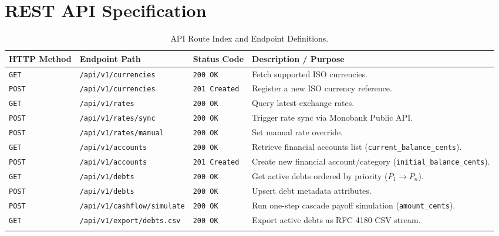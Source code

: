 \documentclass[11pt,a4paper]{article}
\begin{document}
\section{REST API Specification}

\noindent\begin{longtable}{@{\extracolsep{\fill}} l l l p{5.5cm} @{}}
\toprule
\textbf{HTTP Method} & \textbf{Endpoint Path} & \textbf{Status Code} & \textbf{Description / Purpose} \\ \midrule
\endhead
\bottomrule
\endfoot
\texttt{GET} & \texttt{/api/v1/currencies} & \texttt{200 OK} & Fetch supported ISO currencies. \\
\texttt{POST} & \texttt{/api/v1/currencies} & \texttt{201 Created} & Register a new ISO currency reference. \\
\texttt{GET} & \texttt{/api/v1/rates} & \texttt{200 OK} & Query latest exchange rates. \\
\texttt{POST} & \texttt{/api/v1/rates/sync} & \texttt{200 OK} & Trigger rate sync via Monobank Public API. \\
\texttt{POST} & \texttt{/api/v1/rates/manual} & \texttt{200 OK} & Set manual rate override. \\
\texttt{GET} & \texttt{/api/v1/accounts} & \texttt{200 OK} & Retrieve financial accounts list (\texttt{current\_balance\_cents}). \\
\texttt{POST} & \texttt{/api/v1/accounts} & \texttt{201 Created} & Create new financial account/category (\texttt{initial\_balance\_cents}). \\
\texttt{GET} & \texttt{/api/v1/debts} & \texttt{200 OK} & Get active debts ordered by priority ($P_1 \to P_n$). \\
\texttt{POST} & \texttt{/api/v1/debts} & \texttt{200 OK} & Upsert debt metadata attributes. \\
\texttt{POST} & \texttt{/api/v1/cashflow/simulate} & \texttt{200 OK} & Run one-step cascade payoff simulation (\texttt{amount\_cents}). \\
\texttt{GET} & \texttt{/api/v1/export/debts.csv} & \texttt{200 OK} & Export active debts as RFC 4180 CSV stream. \\
\caption{API Route Index and Endpoint Definitions.}
\end{longtable}
\end{document}
